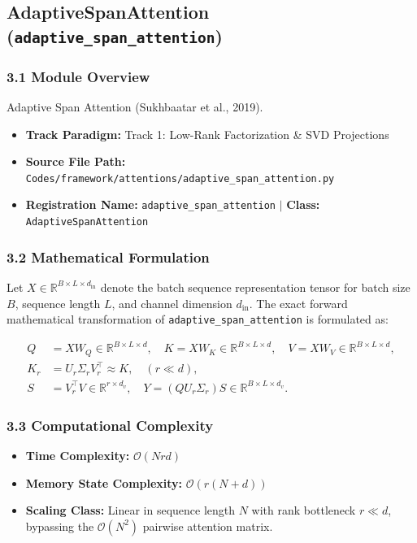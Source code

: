 \subsection{AdaptiveSpanAttention (\texttt{adaptive\_span\_attention})}
\label{sec:app_module_adaptive_span_attention}

\subsubsection*{3.1 Module Overview}
Adaptive Span Attention (Sukhbaatar et al., 2019).
\begin{itemize}
    \item \textbf{Track Paradigm:} Track 1: Low-Rank Factorization \& SVD Projections
    \item \textbf{Source File Path:} \texttt{Codes/framework/attentions/adaptive\_span\_attention.py}
    \item \textbf{Registration Name:} \texttt{adaptive\_span\_attention} $\mid$ \textbf{Class:} \texttt{AdaptiveSpanAttention}
\end{itemize}

\subsubsection*{3.2 Mathematical Formulation}
Let $X \in \mathbb{R}^{B \times L \times d_{\text{in}}}$ denote the batch sequence representation tensor for batch size $B$, sequence length $L$, and channel dimension $d_{\text{in}}$. The exact forward mathematical transformation of \texttt{adaptive\_span\_attention} is formulated as:

\begin{align}
Q &= X W_Q \in \mathbb{R}^{B \times L \times d}, \quad K = X W_K \in \mathbb{R}^{B \times L \times d}, \quad V = X W_V \in \mathbb{R}^{B \times L \times d}, \\
K_r &= U_r \Sigma_r V_r^\top \approx K, \quad (r \ll d), \\
S &= V_r^\top V \in \mathbb{R}^{r \times d_v}, \quad Y = (Q U_r \Sigma_r) S \in \mathbb{R}^{B \times L \times d_v}.
\end{align}


\subsubsection*{3.3 Computational Complexity}
\begin{itemize}
    \item \textbf{Time Complexity:} $\mathcal{O}(N r d)$
    \item \textbf{Memory State Complexity:} $\mathcal{O}(r(N + d))$
    \item \textbf{Scaling Class:} Linear in sequence length $N$ with rank bottleneck $r \ll d$, bypassing the $\mathcal{O}(N^2)$ pairwise attention matrix.
\end{itemize}

